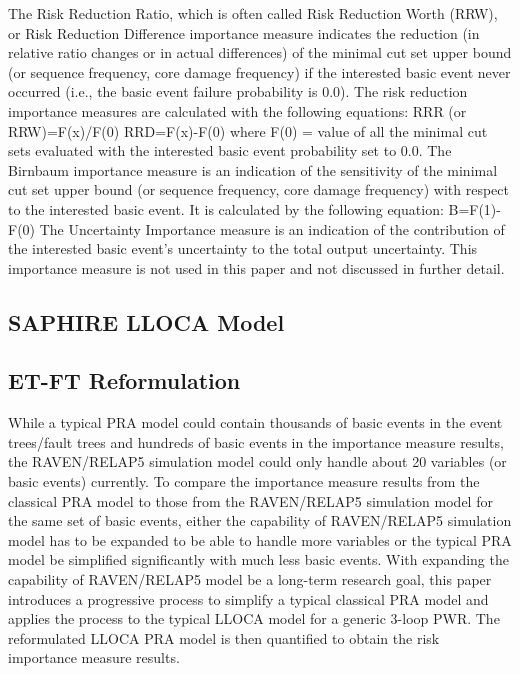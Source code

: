 The Risk Reduction Ratio, which is often called Risk Reduction Worth (RRW), 
or Risk Reduction Difference importance measure indicates the reduction (in relative 
ratio changes or in actual differences) of the minimal cut set upper bound (or sequence 
frequency, core damage frequency) if the interested basic event never occurred 
(i.e., the basic event failure probability is 0.0). 
The risk reduction importance measures are calculated with the following equations:
RRR (or RRW)=F(x)/F(0)
RRD=F(x)-F(0)
where F(0) = value of all the minimal cut sets evaluated with the interested basic 
event probability set to 0.0.
The Birnbaum importance measure is an indication of the sensitivity of the minimal 
cut set upper bound (or sequence frequency, core damage frequency) with respect to 
the interested basic event. It is calculated by the following equation:
B=F(1)-F(0)
The Uncertainty Importance measure is an indication of the contribution of the 
interested basic event’s uncertainty to the total output uncertainty. 
This importance measure is not used in this paper and not discussed in further detail.

\subsection{SAPHIRE LLOCA Model}


\subsection{ET-FT Reformulation}

While a typical PRA model could contain thousands of basic events in the 
event trees/fault trees and hundreds of basic events in the importance measure 
results, the RAVEN/RELAP5 simulation model could only handle about 20 variables 
(or basic events) currently. To compare the importance measure results from the 
classical PRA model to those from the RAVEN/RELAP5 simulation model for the same 
set of basic events, either the capability of RAVEN/RELAP5 simulation model has 
to be expanded to be able to handle more variables or the typical PRA model be 
simplified significantly with much less basic events. With expanding the capability 
of RAVEN/RELAP5 model be a long-term research goal, this paper introduces a 
progressive process to simplify a typical classical PRA model and applies the 
process to the typical LLOCA model for a generic 3-loop PWR. The reformulated 
LLOCA PRA model is then quantified to obtain the risk importance measure results.


